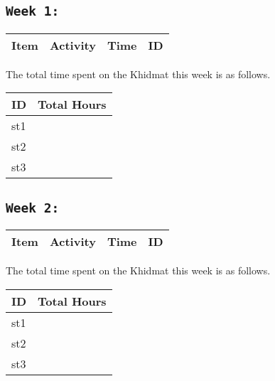 \documentclass[11pt]{article}
\begin{document}
\subsection{\texttt{Week 1: }}
\begin{center}
\begin{tabular}{|l|l|l|l|}
  \hline
  \textbf{Item} 	& \textbf{Activity} & \textbf{Time} & \textbf{ID} \\\hline
  
\end{tabular}
    
\end{center}
The total time spent on the Khidmat this week is as follows.    
\begin{center}
    
\begin{tabular}{|l|l|}
  \hline
  \textbf{ID} & \textbf{Total Hours}\\\hline
  st1 & \\\hline
  st2 & \\\hline
  st3 & \\\hline
\end{tabular}
\end{center}
\newpage
\subsection{\texttt{Week 2: }}
\begin{center}
\begin{tabular}{|l|l|l|l|}
  \hline
  \textbf{Item} 	& \textbf{Activity} & \textbf{Time} & \textbf{ID} \\\hline
  
\end{tabular}
    
\end{center}
The total time spent on the Khidmat this week is as follows.    
\begin{center}
    
\begin{tabular}{|l|l|}
  \hline
  \textbf{ID} & \textbf{Total Hours}\\\hline
  st1 & \\\hline
  st2 & \\\hline
  st3 & \\\hline
\end{tabular}
\end{center}
\newpage
\end{document}
